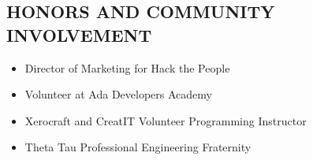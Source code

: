 \documentclass{res}
\begin{document}
\begin{resume}
\section{HONORS AND COMMUNITY INVOLVEMENT}
  \begin{itemize} \itemsep -2pt %
    \item Director of Marketing for Hack the People
    \item Volunteer at Ada Developers Academy
    \item Xerocraft and CreatIT Volunteer Programming Instructor
    \item Theta Tau Professional Engineering Fraternity
  \end{itemize}

\end{resume}
\end{document}
